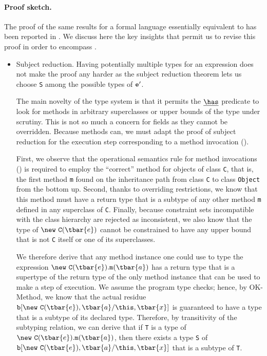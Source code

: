 \paragraph{Proof sketch.} The proof of the same results for a
formal language essentially equivalent to \FXD{} has been
reported in \cite{constrained-types}. We discuss here the key
insights that permit us to revise this proof in order to encompass \FXGD{}.
\begin{itemize}
\item Subject reduction. Having potentially multiple types for
an expression does not make the proof any harder as the subject
reduction theorem lets us choose {\tt S} among the possible types of ${\tt e}'$.

The main novelty of the \FXG{} type system is that it permits
the $\underline\has$ predicate to look for methods in arbitrary
superclasses or upper bounds of the type under scrutiny. This is
not so much a concern for fields as they cannot be overridden.
Because methods can, we must adapt the proof of subject reduction for the execution step corresponding to a method invocation (\RInvk).

First, we observe that the operational semantics rule for method
invocations (\RInvk) is required to employ the ``correct''
method for objects of class {\tt C}, that is, the first method
{\tt m} found on the inheritance path from class {\tt C} to
class {\tt Object} from the bottom up. Second, thanks
to overriding restrictions, we know that this method must have a
return type that is a subtype of any other method {\tt m}
defined in any superclass of {\tt C}. Finally, because
constraint sets incompatible with the class hierarchy are
rejected as inconsistent, we also know that the type of
$\new~{\tt C}(\tbar{e})$ cannot be constrained to have any upper
bound that is not {\tt C} itself or one of its superclasses.

We
therefore derive that any method instance one could use to type
the expression $\new~{\tt C}(\tbar{e}).{\tt m}(\tbar{a})$ has a
return type that is a supertype of the return type of the only
method instance that can be used to make a step of execution. We
assume the program type checks; hence, by {\sc OK-Method}, we
know that the actual residue ${\tt b}[\new~{\tt C}(\tbar{e}),\tbar{a}/\this,\tbar{x}]$ is guaranteed to have a
type that is a subtype of its declared type. Therefore, by
transitivity of the subtyping relation, we can derive that if
{\tt T} is a type of $\new~{\tt C}(\tbar{e}).{\tt m}(\tbar{a})$,
then there exists a type {\tt S} of
${\tt b}[\new~{\tt C}(\tbar{e}),\tbar{a}/\this,\tbar{x}]$
that is a subtype of {\tt T}.


\end{itemize}
